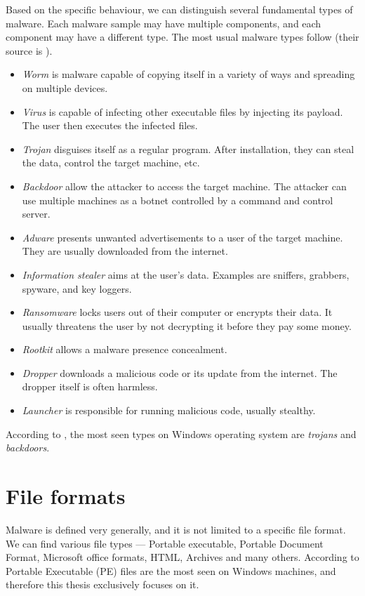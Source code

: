 Based on the specific behaviour, we can distinguish several fundamental types of malware. Each malware sample may have multiple components, and each component may have a different type. The most usual malware types follow (their source is \cite{Cole2009, KA2018, Graham2010, Sikorski2012}).
\begin{itemize}
  \itemsep0em 
  \item \emph{Worm} is malware capable of copying itself in a variety of ways and spreading on multiple devices.
  \item \emph{Virus} is capable of infecting other executable files by injecting its payload. The user then executes the infected files.
  \item \emph{Trojan} disguises itself as a regular program. After installation, they can steal the data, control the target machine, etc.
  \item \emph{Backdoor} allow the attacker to access the target machine. The attacker can use multiple machines as a botnet controlled by a command and control server.
  \item \emph{Adware} presents unwanted advertisements to a user of the target machine. They are usually downloaded from the internet.
  \item \emph{Information stealer} aims at the user's data. Examples are sniffers, grabbers, spyware, and key loggers.
  \item \emph{Ransomware} locks users out of their computer or encrypts their data. It usually threatens the user by not decrypting it before they pay some money.
  \item \emph{Rootkit} allows a malware presence concealment.
  \item \emph{Dropper} downloads a malicious code or its update from the internet. The dropper itself is often harmless.
  \item \emph{Launcher} is responsible for running malicious code, usually stealthy.
\end{itemize}

According to \cite{AVATLASM39:online}, the most seen types on Windows operating system are \emph{trojans} and \emph{backdoors}.

\section{File formats}
Malware is defined very generally, and it is not limited to a specific file format. We can find various file types --- Portable executable, Portable Document Format, Microsoft office formats, HTML, Archives and many others. According to \cite{AVATLASM39:online} Portable Executable (PE) files are the most seen on Windows machines, and therefore this thesis exclusively focuses on it.


